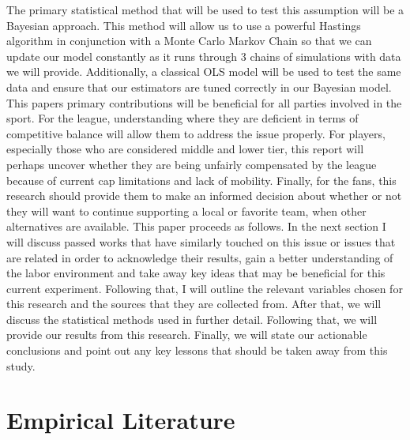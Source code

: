 \documentclass[12pt,english]{article}
\begin{document}
\newline
The primary statistical method that will be used to test this assumption will be a Bayesian approach. This method will allow us to use a powerful Hastings algorithm in conjunction with a Monte Carlo Markov Chain so that we can update our model constantly as it runs through 3 chains of simulations with data we will provide. Additionally, a classical OLS model will be used to test the same data and ensure that our estimators are tuned correctly in our Bayesian model. 
This papers primary contributions will be beneficial for all parties involved in the sport. For the league, understanding where they are deficient in terms of competitive balance will allow them to address the issue properly. For players, especially those who are considered middle and lower tier, this report will perhaps uncover whether they are being unfairly compensated by the league because of current cap limitations and lack of mobility. Finally, for the fans, this research should provide them to make an informed decision about whether or not they will want to continue supporting a local or favorite team, when other alternatives are available. 
\newline
This paper proceeds as follows. In the next section I will discuss passed works that have similarly touched on this issue or issues that are related in order to acknowledge their results, gain a better understanding of the labor environment and take away key ideas that may be beneficial for this current experiment. Following that, I will outline the relevant variables chosen for this research and the sources that they are collected from. After that, we will discuss the statistical methods used in further detail. Following that, we will provide our results from this research. Finally, we will state our actionable conclusions and point out any key lessons that should be taken away from this study. 




\section{Empirical Literature} \label{sec:litreview}
 
\end{document}
